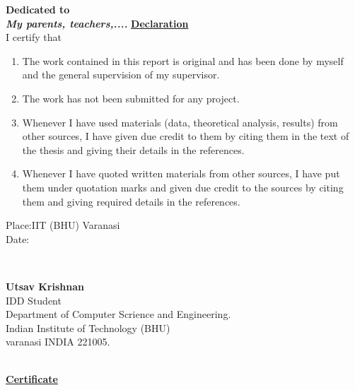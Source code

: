 \documentclass[a4paper]{report}
\begin{document}
{\center \bfseries
{\Huge Dedicated to} \\[1cm]
\emph{{\huge My parents, teachers,....}
}}
\newpage
{\center \bfseries
{\Huge \underline{Declaration}} \\[1cm]
} 
I certify that
\begin{enumerate}
	\item The work contained in this report is original and has been done by myself and the general supervision of my supervisor.\newline
	\item The work has not been submitted for any project.\newline
	\item Whenever I have used materials (data, theoretical analysis, results) from other
sources, I have given due credit to them by citing them in the text of the thesis
and giving their details in the references.\newline
	\item Whenever I have quoted written materials from other sources, I have put them \newline
under quotation marks and given due credit to the sources by citing them and
giving required details in the references.\newline
\end{enumerate}

\begin{minipage}{0.3\textwidth}
\begin{flushleft} \large
Place:IIT (BHU) Varanasi \\
 Date: \\%
\end{flushleft}
\end{minipage}
~
\begin{minipage}{0.67\textwidth}
\begin{flushright} \large{
\bfseries{Utsav Krishnan}} \\
 IDD Student \\
Department of Computer Scrience and Engineering.\\ %
Indian Institute of Technology (BHU)\\ varanasi 
INDIA 221005.
\end{flushright}
\end{minipage}\\[1cm]

\newpage
{\center \bfseries
{\Huge \underline{Certificate}} \\[1cm]
} 
{}\\[2cm]
\end{document}
